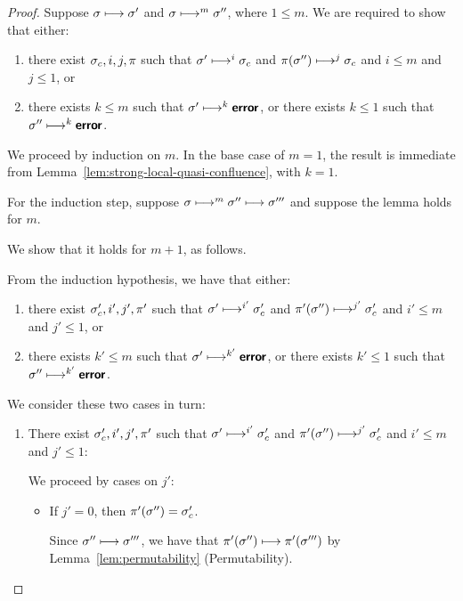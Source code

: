 \begin{proof}
  Suppose $\sigma \longmapsto \sigma'$ and $\sigma \longmapsto^m
  \sigma''$, where $1 \leq m$.  We are required to show that either:
  \begin{enumerate}
    \item there exist $\sigma_c, i, j, \pi$ such that $\sigma'
      \longmapsto^i \sigma_c$ and $\pi(\sigma'') \longmapsto^j \sigma_c$
      and $i \leq m$ and $j \leq 1$, or
    \item there exists $k \leq m$ such that $\sigma' \longmapsto^k
      \textup{\ensuremath{\textbf{\textsf{error}}}}$, or there exists $k \leq 1$ such that $\sigma''
      \longmapsto^k \textup{\ensuremath{\textbf{\textsf{error}}}}$.
  \end{enumerate}

  We proceed by induction on $m$.  In the base case of $m = 1$, the
  result is immediate from
  Lemma~\ref{lem:strong-local-quasi-confluence}, with $k = 1$.

  For the induction step, suppose $\sigma \longmapsto^m \sigma''
  \longmapsto \sigma'''$ and suppose the lemma holds for $m$.

  We show that it holds for $m + 1$, as follows.

  From the induction hypothesis, we have that either:
  \begin{enumerate}
    \item there exist $\sigma_c', i', j', \pi'$ such that $\sigma'
      \longmapsto^{i'} \sigma_c'$ and $\pi'(\sigma'') \longmapsto^{j'}
      \sigma_c'$ and $i' \leq m$ and $j' \leq 1$, or
    \item there exists $k' \leq m$ such that $\sigma'
      \longmapsto^{k'} \textbf{\textsf{error}}$, or there exists $k' \leq 1$ such that
      $\sigma'' \longmapsto^{k'} \textbf{\textsf{error}}$.
  \end{enumerate}

  We consider these two cases in turn:
  \begin{enumerate}
    \item There exist $\sigma_c', i', j', \pi'$ such that $\sigma'
      \longmapsto^{i'} \sigma_c'$ and $\pi'(\sigma'') \longmapsto^{j'}
      \sigma_c'$ and $i' \leq m$ and $j' \leq 1$:

      We proceed by cases on $j'$:
      \begin{itemize}

      \item If $j' = 0$, then $\pi'(\sigma'') = \sigma_c'$.

        Since $\sigma'' \longmapsto \sigma'''$, we have that
        $\pi'(\sigma'') \longmapsto \pi'(\sigma''')$ by
        Lemma~\ref{lem:permutability} (Permutability).


\end{itemize}
\end{enumerate}
\end{proof}
